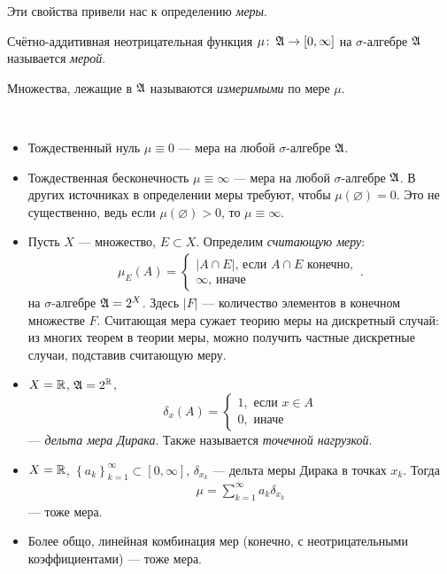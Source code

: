 Эти свойства привели нас к определению \textit{меры}.

\begin{df}
 \label{definition:measure}
 Счётно-аддитивная неотрицательная функция $\mu \colon\, \mathfrak{A} \to [0,\infty] $  на $\sigma$-алгебре $\mathfrak{A}$ называется \textit{мерой}.

 Множества, лежащие в $\mathfrak{A}$ называются \textit{измеримыми} по мере $\mu$.
\end{df}
\begin{exmpl}\
 \begin{itemize}
  \item Тождественный нуль $ \mu \equiv 0 $ --- мера на любой $\sigma$-алгебре $\mathfrak{A}$.
  \item Тождественная бесконечность $ \mu \equiv \infty $ --- мера на любой $\sigma$-алгебре $\mathfrak{A}$. В других источниках в определении меры требуют, чтобы $\mu(\varnothing) = 0$. Это не существенно, ведь если $\mu(\varnothing) > 0$, то $\mu \equiv \infty$.
  \item Пусть $ X $ --- множество, $ E \subset X $. Определим \textit{считающую меру}:
   \begin{align*}
    \mu_E(A) =
    \begin{cases}
     \left| A \cap E \right| \text{, если } A \cap E \text { конечно}, \\
     \infty \text {, иначе }
    \end{cases}
   .\end{align*} на $\sigma$-алгебре $ \mathfrak{A} = 2^X $. Здесь $\left| F \right|$ --- количество элементов в конечном множестве $F$. Считающая мера сужает теорию меры на дискретный случай: из многих теорем в теории меры, можно получить частные дискретные случаи, подставив считающую меру.
  \item $ X = \mathbb{R} $, $\mathfrak{A} = 2^{\mathbb{R}}$, $$ \delta_x(A) =
   \begin{cases}
    1, \text{ если } x \in A \\
    0, \text { иначе }
   \end{cases}$$ --- \textit{дельта мера Дирака}. Также называется \textit{точечной нагрузкой}.
  \item $ X = \mathbb{R} $, $  \left\{ a_k \right\}_{k=1}^\infty \subset [0, \infty] $, $ \delta_{x_k} $ --- дельта меры Дирака в точках $ x_k $. Тогда
   \begin{align*}
    \mu = \sum_{k=1}^\infty a_k \delta_{x_k}
   \end{align*} --- тоже мера.
  \item Более общо, линейная комбинация мер (конечно, с неотрицательными коэффициентами) --- тоже мера.
 \end{itemize}
\end{exmpl}


